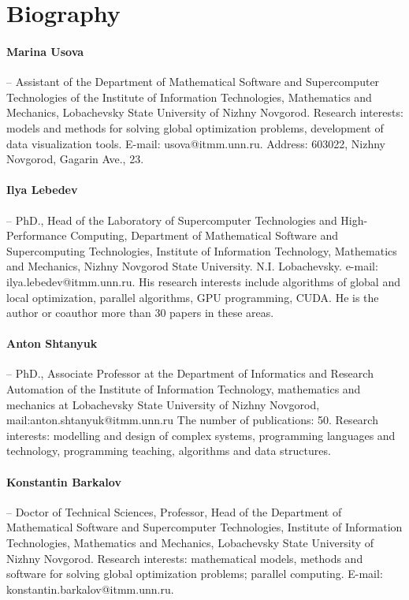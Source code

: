 \documentclass[a4paper,12pt,russian]{article}
\begin{document}
\section*{Biography}

\paragraph{Marina Usova} -- Assistant of the Department of Mathematical Software and Supercomputer Technologies of the Institute of Information Technologies, Mathematics and Mechanics, Lobachevsky State University of Nizhny Novgorod. Research interests: models and methods for solving global optimization problems, development of data visualization tools. E-mail: usova@itmm.unn.ru. Address: 603022, Nizhny Novgorod, Gagarin Ave., 23.
\paragraph{Ilya Lebedev} -- PhD., Head of the Laboratory of Supercomputer Technologies and High-Performance Computing, Department of Mathematical Software and Supercomputing Technologies, Institute of Information Technology, Mathematics and Mechanics, Nizhny Novgorod State University. N.I. Lobachevsky. e-mail: ilya.lebedev@itmm.unn.ru. His research interests include algorithms of global and local optimization, parallel algorithms, GPU programming, CUDA. He is the author or coauthor more than 30 papers in these areas.
\paragraph{Anton Shtanyuk} -- PhD., Associate Professor at the Department of Informatics and Research Automation of the Institute of Information Technology, mathematics and mechanics at Lobachevsky State University of Nizhny Novgorod, mail:anton.shtanyuk@itmm.unn.ru The number of publications: 50. Research interests: modelling and design of complex systems, programming languages and technology, programming teaching, algorithms and data structures.
\paragraph{Konstantin Barkalov} -- Doctor of Technical Sciences, Professor, Head of the Department of Mathematical Software and Supercomputer Technologies, Institute of Information Technologies, Mathematics and Mechanics, Lobachevsky State University of Nizhny Novgorod. Research interests: mathematical models, methods and software for solving global optimization problems; parallel computing. E-mail: konstantin.barkalov@itmm.unn.ru.
\end{document}
